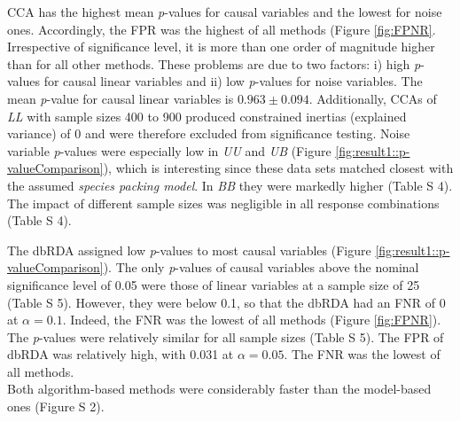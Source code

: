 
		CCA has the highest mean \textit{p}-values for causal variables and the lowest for noise ones. 
		Accordingly, the FPR was the highest of all methods (Figure \ref{fig:FPNR}.
		Irrespective of significance level, it is more than one order of magnitude higher than for all other methods.
		These problems are due to two factors: i) high \textit{p}-values for causal linear variables and ii) low \textit{p}-values for noise variables. 
		The mean \textit{p}-value for causal linear variables is $0.963\pm0.094$. 
        Additionally, CCAs of \textit{LL} with sample sizes 400 to 900 produced constrained inertias (explained variance) of 0 and were therefore excluded from significance testing. 
		Noise variable \textit{p}-values were especially low in \textit{UU} and \textit{UB} (Figure \ref{fig:result1::p-valueComparison}), which is interesting since these data sets matched closest with the assumed \textit{species packing model}.  
		In \textit{BB} they were markedly higher (Table S 4). 
        The impact of different sample sizes was negligible in all response combinations (Table S 4).   


		The dbRDA assigned low \textit{p}-values to most causal variables (Figure \ref{fig:result1::p-valueComparison}).
		The only \textit{p}-values of causal variables above the nominal significance level of 0.05 were those of linear variables at a sample size of 25 (Table S 5).
		However, they were below 0.1, so that the dbRDA had an FNR of 0 at $\alpha = 0.1$.  
		Indeed, the FNR was the lowest of all methods (Figure \ref{fig:FPNR}).
        The \textit{p}-values were relatively similar for all sample sizes (Table S 5). 
        The FPR of dbRDA was relatively high, with 0.031 at $\alpha = 0.05$.  
        The FNR was the lowest of all methods. \\
        Both algorithm-based methods were considerably faster than the model-based ones (Figure S 2).

	